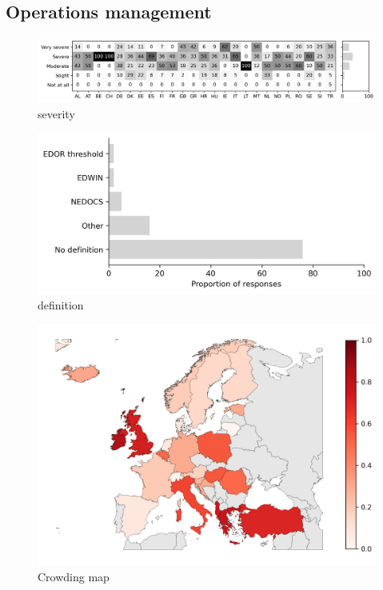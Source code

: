 \documentclass{article}
\begin{document}
\subsection{Operations management}
\lipsum[4-6]

\begin{figure}[H]
    \centering
        \includegraphics[width=1.0\textwidth]{../output/plots/severity}
        \caption{severity}
        \label{fig:severity}
\end{figure}

\begin{figure}[H]
    \centering
        \includegraphics[width=1.0\textwidth]{../output/plots/definition}
        \caption{definition}
        \label{fig:definition}
\end{figure}

\begin{figure}[H]
    \centering
        \includegraphics[width=1.0\textwidth]{../output/plots/crowding_map}
        \caption{Crowding map}
        \label{fig:crowding_map}
\end{figure}
\end{document}
